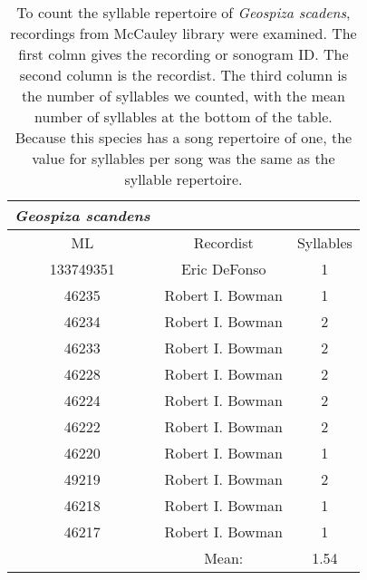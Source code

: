 \documentclass[a4paper,12pt]{article}
\begin{document}
\begin{table}[ht]
\caption{To count the syllable repertoire of \textit{Geospiza scadens}, recordings from McCauley library were examined.  The first colmn gives the recording or sonogram ID.  The second column is the recordist.  The third column is the number of syllables we counted, with the mean number of syllables at the bottom of the table.  Because this species has a song repertoire of one, the value for syllables per song was the same as the syllable repertoire.}
\centering
\begin{tabular}{ccc}
  \hline
\textit{Geospiza scandens} &  &  \\ 
  \hline \hline
ML & Recordist & Syllables \\ \hline
  133749351 & Eric DeFonso  & 1 \\ 
  46235 & Robert I. Bowman & 1 \\ 
  46234 & Robert I. Bowman & 2 \\ 
  46233 & Robert I. Bowman & 2 \\ 
  46228 & Robert I. Bowman & 2 \\ 
  46224 & Robert I. Bowman & 2 \\ 
  46222 & Robert I. Bowman & 2 \\ 
  46220 & Robert I. Bowman & 1 \\ 
  49219 & Robert I. Bowman & 2 \\ 
  46218 & Robert I. Bowman & 1 \\ 
  46217 & Robert I. Bowman & 1 \\ \hline
   & Mean: & 1.54 \\ 
   \hline
\end{tabular}
\end{table}
\end{document}
